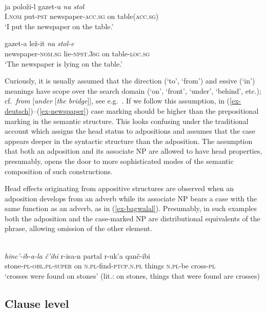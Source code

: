 \documentclass[output=paper
  ,nobabel
  ,draftmode
  ,colorlinks, citecolor=brown
]{langscibook}
\begin{document}
\ea\label{ex-newspaper}  
\\ 
\ea
\gll ja	položi-l   gazet-u	 \emph{na} \emph{stol}\\ 
     I.\textsc{nom}	put-\textsc{pst} newspaper-\textsc{acc.sg} on table(\textsc{acc.sg}) \\
\glt `I put the newspaper on the table.'

\ex
\gll gazet-a lež-it  \emph{na} \emph{stol-e}\\ newspaper-\textsc{nom.sg} lie-\textsc{npst.3sg} on table-\textsc{loc.sg}\\
\glt `The newspaper is lying on the table.'
\z\z

\noindent
Curiously, it is usually assumed that the direction (`to', `from') and essive (`in') meanings have scope
over the search domain (`on', `front', `under', `behind', etc.); cf.\ \emph{from} [\emph{under} [\emph{the bridge}]], see
e.g.\ \citet{CR2010a}. If we follow this assumption, in (\ref{ex-deutsch})--(\ref{ex-newspaper}) case
marking should be higher than the prepositional marking in the semantic structure. This looks
confusing under the traditional account which assigns the head status to adpositions and assumes
that the case appears deeper in the syntactic structure than the adposition. The assumption that
both an adposition and its associate NP are allowed to have head properties, presumably, opens the
door to more sophisticated modes of the semantic composition of such constructions.

Head effects originating from appositive structures are observed when an adposition develops from an
adverb while its associate NP bears a case with the same function as an adverb, as in
(\ref{ex-bagwalal}). Presumably, in such examples both the adposition and the case-marked NP are
distributional equivalents of the phrase, allowing omission of the other element.  

\ea\label{ex-bagwalal} 
\\
\gll \emph{hinc'-ib-a-la}                  \emph{č’ihi}  r-isa-n partal	r-uk’a	qanč-ibi  \\ 
     stone-\textsc{pl-obl.pl-super} on \textsc{n.pl}-find-\textsc{ptcp.n.pl}	things \textsc{n.pl}-be	cross-\textsc{pl} \\
\glt `crosses were found on stones' (lit.: on stones, things that were found are crosses)
\z

\subsection{Clause level}\label{subsec-clause}
\end{document}
